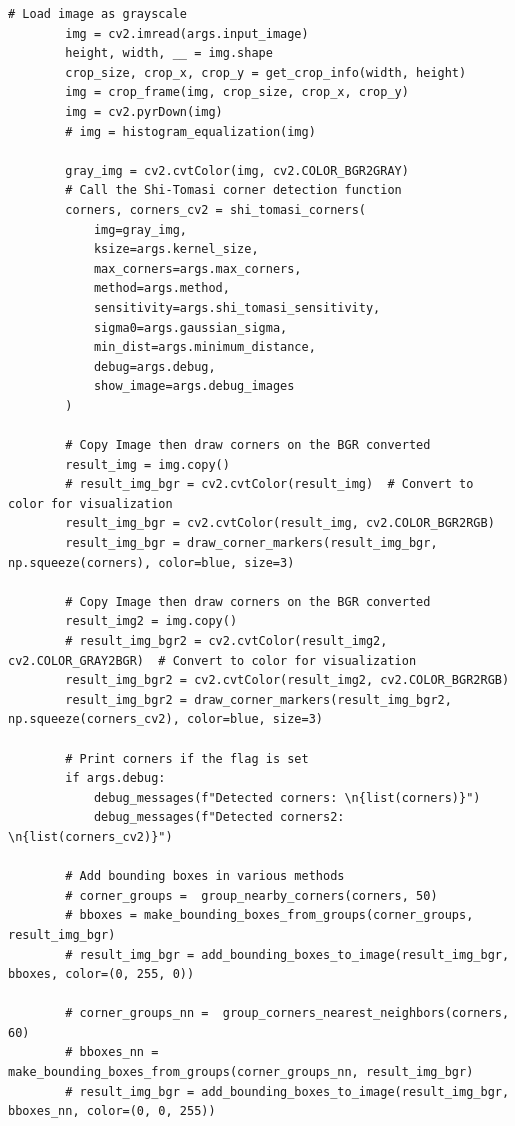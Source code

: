 \documentclass[11pt, conference, letterpaper]{IEEEtran}
\begin{document}
\begin{lstlisting}[style=python, caption={\texttt{shi\_tomasi\_corners.py}}, label={lst:stc}]
        # Load image as grayscale
        img = cv2.imread(args.input_image)
        height, width, __ = img.shape
        crop_size, crop_x, crop_y = get_crop_info(width, height)
        img = crop_frame(img, crop_size, crop_x, crop_y)
        img = cv2.pyrDown(img)
        # img = histogram_equalization(img)
    
        gray_img = cv2.cvtColor(img, cv2.COLOR_BGR2GRAY)
        # Call the Shi-Tomasi corner detection function
        corners, corners_cv2 = shi_tomasi_corners(
            img=gray_img,
            ksize=args.kernel_size,
            max_corners=args.max_corners,
            method=args.method,
            sensitivity=args.shi_tomasi_sensitivity,
            sigma0=args.gaussian_sigma,
            min_dist=args.minimum_distance,
            debug=args.debug,
            show_image=args.debug_images
        )
    
        # Copy Image then draw corners on the BGR converted
        result_img = img.copy()
        # result_img_bgr = cv2.cvtColor(result_img)  # Convert to color for visualization
        result_img_bgr = cv2.cvtColor(result_img, cv2.COLOR_BGR2RGB)
        result_img_bgr = draw_corner_markers(result_img_bgr, np.squeeze(corners), color=blue, size=3)
        
        # Copy Image then draw corners on the BGR converted
        result_img2 = img.copy()
        # result_img_bgr2 = cv2.cvtColor(result_img2, cv2.COLOR_GRAY2BGR)  # Convert to color for visualization
        result_img_bgr2 = cv2.cvtColor(result_img2, cv2.COLOR_BGR2RGB)
        result_img_bgr2 = draw_corner_markers(result_img_bgr2, np.squeeze(corners_cv2), color=blue, size=3)
    
        # Print corners if the flag is set
        if args.debug:
            debug_messages(f"Detected corners: \n{list(corners)}")
            debug_messages(f"Detected corners2: \n{list(corners_cv2)}")
           
        # Add bounding boxes in various methods
        # corner_groups =  group_nearby_corners(corners, 50)
        # bboxes = make_bounding_boxes_from_groups(corner_groups, result_img_bgr)
        # result_img_bgr = add_bounding_boxes_to_image(result_img_bgr, bboxes, color=(0, 255, 0))
        
        # corner_groups_nn =  group_corners_nearest_neighbors(corners, 60)
        # bboxes_nn = make_bounding_boxes_from_groups(corner_groups_nn, result_img_bgr)
        # result_img_bgr = add_bounding_boxes_to_image(result_img_bgr, bboxes_nn, color=(0, 0, 255))
        

\end{lstlisting}
\end{document}
